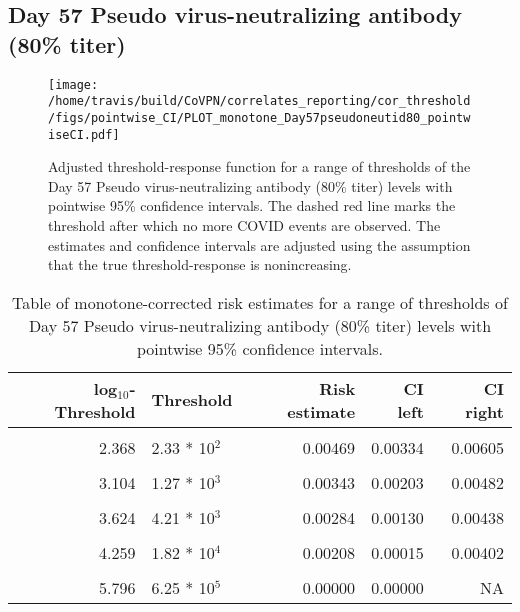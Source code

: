 \documentclass[]{book}
\theoremstyle{definition}
\theoremstyle{definition}
\theoremstyle{definition}
\newcommand{\1}{\mathbbm{1}}
\begin{document}
\newpage

\newpage

\newpage

\hypertarget{day-57-pseudo-virus-neutralizing-antibody-80-titer-1}{%
\subsection{Day 57 Pseudo virus-neutralizing antibody (80\% titer)}\label{day-57-pseudo-virus-neutralizing-antibody-80-titer-1}}

\begin{figure}[H]
\centering
\texttt{[image: /home/travis/build/CoVPN/correlates\_reporting/cor\_threshold/figs/pointwise\_CI/PLOT\_monotone\_Day57pseudoneutid80\_pointwiseCI.pdf]}
\caption{Adjusted threshold-response function for a range of thresholds of the
  Day 57 Pseudo virus-neutralizing antibody (80\% titer) levels with pointwise 95\% confidence intervals. The dashed red line marks the threshold after which no more COVID events are observed. The estimates and confidence intervals are adjusted using the assumption that the true threshold-response is nonincreasing.}
\end{figure}
\begin{table}[!h]

\caption{\label{tab:unnamed-chunk-369}Table of monotone-corrected risk estimates for a range of thresholds of Day 57 Pseudo virus-neutralizing antibody (80\% titer) levels with pointwise 95\% confidence intervals.}
\centering
\begin{tabular}[t]{rlrrr}
\toprule
log$_{10}$-Threshold & Threshold & Risk estimate & CI left & CI right\\
\midrule
\cellcolor{gray!6}{1.289} & \cellcolor{gray!6}{1.95 * 10$^1$} & \cellcolor{gray!6}{0.00514} & \cellcolor{gray!6}{0.00381} & \cellcolor{gray!6}{0.00647}\\
2.368 & 2.33 * 10$^2$ & 0.00469 & 0.00334 & 0.00605\\
\cellcolor{gray!6}{2.755} & \cellcolor{gray!6}{5.69 * 10$^2$} & \cellcolor{gray!6}{0.00428} & \cellcolor{gray!6}{0.00290} & \cellcolor{gray!6}{0.00565}\\
3.104 & 1.27 * 10$^3$ & 0.00343 & 0.00203 & 0.00482\\
\cellcolor{gray!6}{3.373} & \cellcolor{gray!6}{2.36 * 10$^3$} & \cellcolor{gray!6}{0.00312} & \cellcolor{gray!6}{0.00171} & \cellcolor{gray!6}{0.00454}\\
3.624 & 4.21 * 10$^3$ & 0.00284 & 0.00130 & 0.00438\\
\cellcolor{gray!6}{3.909} & \cellcolor{gray!6}{8.11 * 10$^3$} & \cellcolor{gray!6}{0.00243} & \cellcolor{gray!6}{0.00083} & \cellcolor{gray!6}{0.00402}\\
4.259 & 1.82 * 10$^4$ & 0.00208 & 0.00015 & 0.00402\\
\cellcolor{gray!6}{4.676} & \cellcolor{gray!6}{4.74 * 10$^4$} & \cellcolor{gray!6}{0.00208} & \cellcolor{gray!6}{0.00000} & \cellcolor{gray!6}{0.00520}\\
5.796 & 6.25 * 10$^5$ & 0.00000 & 0.00000 & NA\\
\bottomrule
\end{tabular}
\end{table}
\end{document}
